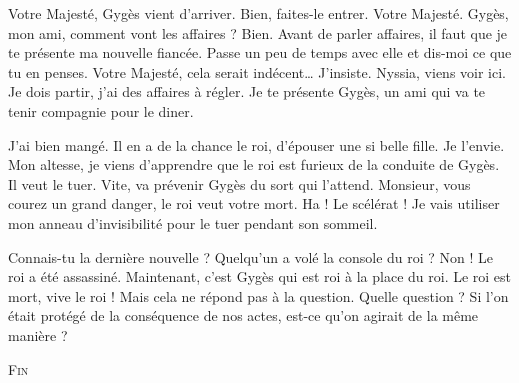 \documentclass[12pt, a5paper, french]{memoir}
\begin{document}
\begin{drama}
\scene

\StageDir{\Gyges, \Candaule, \Nyssia, \Laurel}
\Laurelspeaks Votre Majesté, Gygès vient d’arriver.
\Candaulespeaks Bien, faites-le entrer.
\Gygesspeaks Votre Majesté.
\Candaulespeaks Gygès, mon ami, comment vont les affaires ?
\Gygesspeaks Bien.
\Candaulespeaks Avant de parler affaires, il faut que je te présente ma nouvelle fiancée. Passe un peu de temps avec elle et dis-moi ce que tu en penses.
\Gygesspeaks Votre Majesté, cela serait indécent\dots
\Candaulespeaks J’insiste.  Nyssia, viens voir ici. Je dois partir, j’ai des affaires à régler. Je te présente Gygès, un ami qui va te tenir compagnie pour le diner.

\scene

\StageDir{\Gyges, \Nyssia, \Hardy}
\Gygesspeaks {} J’ai bien mangé. Il en a de la chance le roi, d’épouser une si belle fille. Je l’envie.
\Hardyspeaks {} Mon altesse, je viens d’apprendre que le roi est furieux de la conduite de Gygès. Il veut le tuer.
\Nyssiaspeaks Vite, va prévenir Gygès du sort qui l’attend.
\Hardyspeaks {} Monsieur, vous courez un grand danger, le roi veut votre mort.
\Gygesspeaks Ha ! Le scélérat ! Je vais utiliser mon anneau d’invisibilité pour le tuer pendant son sommeil.

\scene

\StageDir{\Bonnie, \Clyde}
\Bonniespeaks Connais-tu la dernière nouvelle ?
\Clydespeaks Quelqu’un a volé la console du roi ?
\Bonniespeaks Non ! Le roi a été assassiné. Maintenant, c’est Gygès qui est roi à la place du roi.
\Clydespeaks Le roi est mort, vive le roi !
\Bonniespeaks Mais cela ne répond pas à la question.
\Clydespeaks Quelle question ?
\Bonniespeaks Si l’on était protégé de la conséquence de nos actes, est-ce qu’on agirait de la même manière ?
\end{drama}

\hfill
\centering

\textsc{Fin}
\end{document}
